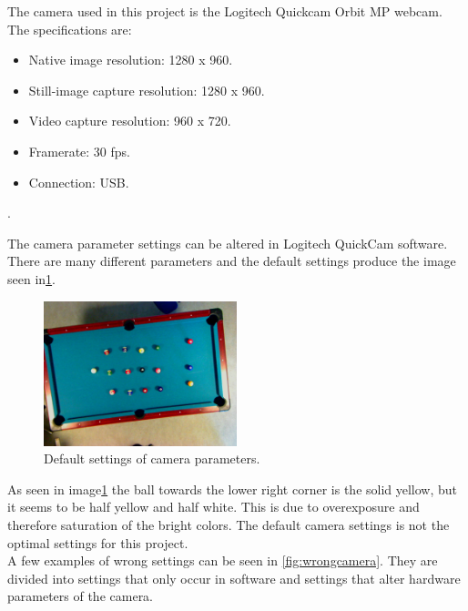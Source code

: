 The camera used in this project is the Logitech Quickcam Orbit MP webcam. The specifications are:

\begin{itemize}
	\item Native image resolution: 1280 x 960.
	\item Still-image capture resolution: 1280 x 960.
	\item Video capture resolution: 960 x 720.
	\item Framerate: 30 fps.
	\item Connection: USB.
\end{itemize}.

The camera parameter settings can be altered in Logitech QuickCam software. There are many different parameters and the default settings produce the image seen in\ref{fig:defaultcamera}.

\begin{figure}[H]
\begin{center}
\leavevmode
\includegraphics[width=0.5\textwidth]{images/default}
\end{center}
\caption{Default settings of camera parameters.}
\label{fig:defaultcamera}
\end{figure} 
	
As seen in image\ref{fig:defaultcamera} the ball towards the lower right corner is the solid yellow, but it seems to be half yellow and half white. This is due to overexposure and therefore saturation of the bright colors. The default camera settings is not the optimal settings for this project.\\	

A few examples of wrong settings can be seen in \ref{fig:wrongcamera}. They are divided into settings that only occur in software and settings that alter hardware parameters of the camera.

